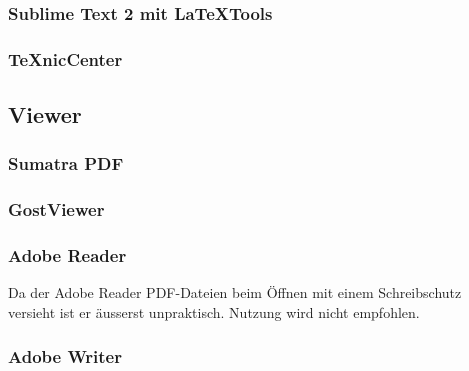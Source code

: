 \subsubsection{Sublime Text 2 mit LaTeXTools}
\subsubsection{TeXnicCenter}

\subsection{Viewer}
\subsubsection{Sumatra PDF}
\subsubsection{GostViewer}
\subsubsection{Adobe Reader}
Da der Adobe Reader  PDF-Dateien beim Öffnen mit einem Schreibschutz versieht ist er äusserst unpraktisch. Nutzung wird nicht empfohlen.
\subsubsection{Adobe Writer}

